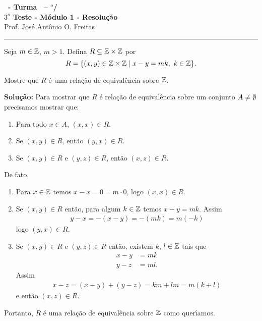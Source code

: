 \documentclass[12pt]{exam}
\begin{document}
\begin{center}
{\Large\bf \disciplina\ - Turma \turma\ -- \semestre$^{o}$/\ano} \\ \vspace{9pt} {\large\bf
$3^{\underline{o}}$ Teste - M\'odulo 1 - Resolu\c{c}\~ao}\\
\vspace{9pt} Prof. Jos{\'e} Ant{\^o}nio O. Freitas
\end{center}
\hrule

\vspace{.6cm}

\questao Seja $m \in \mathbb{Z}$, $m > 1$. Defina $R \subseteq \mathbb{Z} \times \mathbb{Z}$ por
\[
	R = \{ (x, y) \in \z \times \z \mid x - y = mk,\ k \in \z\}.
\]

Mostre que $R$ \'e uma rela\c{c}\~ao de equival\^encia sobre $\mathbb{Z}$.

\noindent\textbf{Solu\c{c}\~ao:} Para mostrar que $R$ \'e rela\c{c}\~ao de equival\^encia sobre um conjunto $A \ne \emptyset$ precisamos mostrar que:
\begin{enumerate}[label={\roman*})]
	\item Para todo $x \in A$, $(x, x) \in R$.
	\item Se $(x, y) \in R$, ent\~ao $(y, x) \in R$.
	\item Se $(x, y) \in R$ e $(y, z) \in R$, ent\~ao $(x, z) \in R$.
\end{enumerate}

De fato,
\begin{enumerate}[label={\roman*})]
	\item Para $x \in \mathbb{Z}$ temos $x - x = 0 = m\cdot 0$, logo $(x, x) \in R$.
	\item Se $(x, y)\in R$ ent\~ao, para algum $k \in \mathbb{Z}$ temos $x - y  = mk$. Assim
	\begin{align*}
		y - x = -(x - y) = -(mk) = m(-k)
	\end{align*}
	logo $(y, x) \in R$.
	\item Se $(x, y) \in R$ e $(y, z) \in R$ ent\~ao, existem $k$, $l \in \mathbb{Z}$ tais que
	\begin{align*}
		x - y &= mk\\
		y - z &= ml.
	\end{align*}
	Assim
	\begin{align*}
		x - z = (x - y) + (y - z) = km + lm = m(k + l)
	\end{align*}
	e então $(x, z) \in R$.
\end{enumerate}

Portanto, $R$ \'e uma rela\c{c}\~ao de equival\^encia sobre $\mathbb{Z}$ como quer{\'\i}amos.
\end{document}
